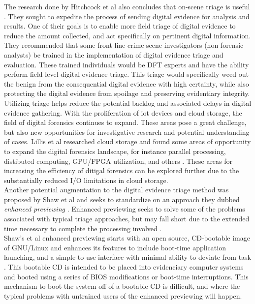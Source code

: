 \documentclass[12pt]{article}
\begin{document}
The research done by Hitchcock et al also concludes that on-scene triage is
useful \cite{hitchcock2016tiered}.  They sought to expedite the process of
sending digital evidence for analysis and results.  One of their goals is to enable
more field triage of digital evidence to reduce the amount collected, and act
specifically on pertinent digital information.  They recommended that some
front-line crime scene investigators (non-forensic analysts) be trained in the
implementation of digital evidence triage and evaluation.  These trained individuals
would be DFT experts and have the ability perform field-level
digital evidence triage.  This triage would specifically weed out the benign from
the consequential digital evidence with high certainty, while also protecting the
digital evidence from spoilage and preserving evidentiary integrity.\\

Utilizing triage helps
reduce the potential backlog and associated delays in digital evidence gathering.
With the proliferation of \gls{iot} devices and cloud storage, the
field of digital forensics continues to expand.  These areas pose a great challenge,
but also new opportunities for investigative research and potential understanding
of cases.  Lillis et al researched cloud storage and found some areas of opportunity
to expand the digital forensics landscape, for instance parallel processing,
distibuted computing, GPU/FPGA utilization, and others \cite{lillis2016current}.
These areas for increasing the efficiency of ditigal forensics can be explored
further due to the substantially reduced I/O limitations in cloud storage.\\

Another potential augmentation to the digital evidence triage method was proposed by
Shaw et al and seeks to standardize on an approach they dubbed {\em enhanced
previewing} \cite{shaw2013practical}.  Enhanced previewing seeks to solve some of the problems
associated with typical triage approaches, but may fall short due to the extended time
necessary to complete the processing involved \cite{jusas2017methods}.\\

Shaw's et al enhanced previewing starts with an open source, CD-bootable image of
GNU/Linux and enhances its features to include boot-time application launching, and
a simple to use interface with minimal ability to deviate from task \cite{shaw2013practical}.
This bootable CD is intended to be placed into evidenciary computer
systems and booted using a series of BIOS modifications or boot-time interruptions.
This mechanism to boot the system off of a bootable CD is difficult, and where the
typical problems with untrained users of the enhanced previewing will happen.\\
\end{document}
